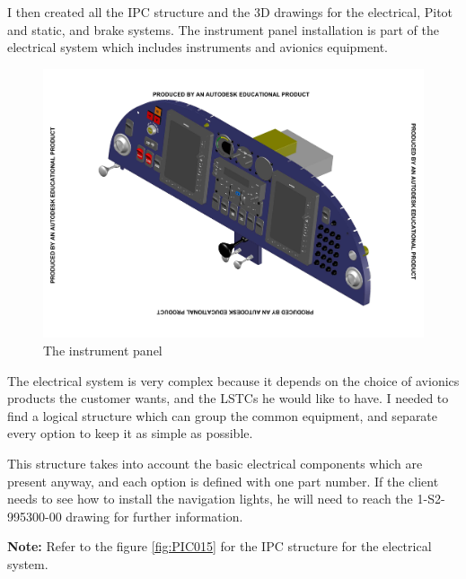\documentclass[11pt,a4paper]{article}
\begin{document}
\newpage

I then created all the IPC structure and the 3D drawings for the electrical, Pitot and static, and brake systems. The instrument panel installation is part of the electrical system which includes instruments and avionics equipment.

\begin{figure}[ht!]
	\begin{center}
		\includegraphics[width=15cm,trim = 2cm 2.2cm 2cm 2.2cm, clip]{pics/PIC016.pdf}
		\caption{The instrument panel}
		\label{fig:PIC016}
	\end{center}
\end{figure}

The electrical system is very complex because it depends on the choice of avionics products the customer wants, and the LSTCs he would like to have. I needed to find a logical structure which can group the common equipment, and separate every option to keep it as simple as possible.

\bigskip

This structure takes into account the basic electrical components which are present anyway, and each option is defined with one part number. If the client needs to see how to install the navigation lights, he will need to reach the 1-S2-995300-00 drawing for further information.

\bigskip

\textbf{Note:} Refer to the figure \ref{fig:PIC015} for the IPC structure for the electrical system.
\end{document}
